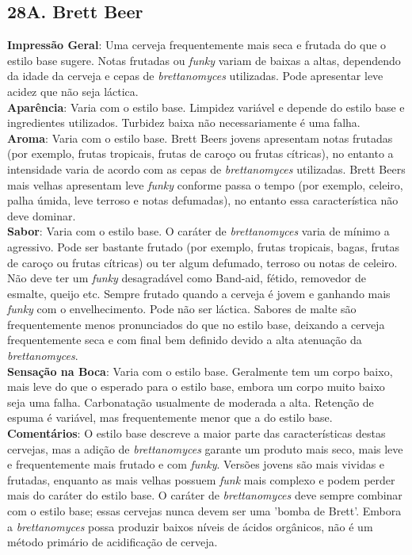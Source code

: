 \subsection*{28A. Brett Beer}
\textbf{Impressão Geral}: Uma cerveja frequentemente mais seca e frutada do que o estilo base sugere. Notas frutadas ou \textit{funky} variam de baixas a altas, dependendo da idade da cerveja e cepas de \textit{brettanomyces} utilizadas. Pode apresentar leve acidez que não seja láctica. \\
\textbf{Aparência}: Varia com o estilo base. Limpidez variável e depende do estilo base e ingredientes utilizados. Turbidez baixa não necessariamente é uma falha. \\
\textbf{Aroma}: Varia com o estilo base. Brett Beers jovens apresentam notas frutadas (por exemplo, frutas tropicais, frutas de caroço ou frutas cítricas), no entanto a intensidade varia de acordo com as cepas de \textit{brettanomyces} utilizadas. Brett Beers mais velhas apresentam leve \textit{funky} conforme passa o tempo (por exemplo, celeiro, palha úmida, leve terroso e notas defumadas), no entanto essa característica não deve dominar. \\
\textbf{Sabor}: Varia com o estilo base. O caráter de \textit{brettanomyces} varia de mínimo a agressivo. Pode ser bastante frutado (por exemplo, frutas tropicais, bagas, frutas de caroço ou frutas cítricas) ou ter algum defumado, terroso ou notas de celeiro. Não deve ter um \textit{funky} desagradável como Band-aid, fétido, removedor de esmalte, queijo etc. Sempre frutado quando a cerveja é jovem e ganhando mais \textit{funky} com o envelhecimento. Pode não ser láctica. Sabores de malte são frequentemente menos pronunciados do que no estilo base, deixando a cerveja frequentemente seca e com final bem definido devido a alta atenuação da \textit{brettanomyces}. \\
\textbf{Sensação na Boca}: Varia com o estilo base. Geralmente tem um corpo baixo, mais leve do que o esperado para o estilo base, embora um corpo muito baixo seja uma falha. Carbonatação usualmente de moderada a alta. Retenção de espuma é variável, mas frequentemente menor que a do estilo base. \\
\textbf{Comentários}: O estilo base descreve a maior parte das características destas cervejas, mas a adição de \textit{brettanomyces} garante um produto mais seco, mais leve e frequentemente mais frutado e com \textit{funky}. Versões jovens são mais vividas e frutadas, enquanto as mais velhas possuem \textit{funk} mais complexo e podem perder mais do caráter do estilo base. O caráter de \textit{brettanomyces} deve sempre combinar com o estilo base; essas cervejas nunca devem ser uma 'bomba de Brett'. Embora a \textit{brettanomyces} possa produzir baixos níveis de ácidos orgânicos, não é um método primário de acidificação de cerveja. \\
